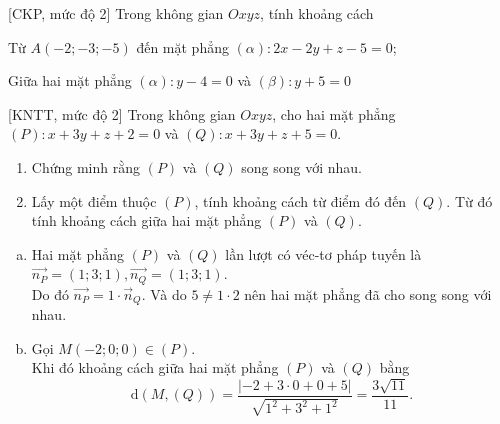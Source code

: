 \begin{bt}%
[CKP, mức độ 2]%
	Trong không gian $Oxyz$, tính khoảng cách
	\begin{listEX}
		\item Từ $ A(-2;-3;-5) $ đến mặt phẳng $ (\alpha) \colon 2x-2y+z-5=0 $;
		\item Giữa hai mặt phẳng $ (\alpha)\colon y-4=0 $ và $ (\beta)\colon y+5=0 $
	\end{listEX}
\end{bt}

\begin{bt}%
[KNTT, mức độ 2]%
	Trong không gian $Oxyz$, cho hai mặt phẳng $(P)\colon x+3y+z+2=0$ và $ (Q)\colon x+3y+z+5=0$.
	\begin{enumerate}
		\item Chứng minh rằng $(P)$ và $(Q)$ song song với nhau.
		\item  Lấy một điểm thuộc $(P)$, tính khoảng cách từ điểm đó đến $(Q)$. Từ đó tính khoảng cách giữa hai mặt phẳng $(P)$ và $(Q)$.
	\end{enumerate}
	\loigiai
	{
		\begin{enumerate}[a)]
			\item Hai mặt phẳng $(P)$ và $(Q)$ lần lượt có véc-tơ pháp tuyến là $\vec{n_P}=(1;3;1),\vec{n_Q}=(1;3;1)$.\\
			Do đó $\vec{n_P}=1 \cdot \vec{n}_Q$. Và do $5 \ne 1 \cdot 2$ nên hai mặt phẳng đã cho song song với nhau.
			\item Gọi $M(-2;0;0) \in (P)$.\\
			Khi đó khoảng cách giữa hai mặt phẳng $(P)$ và $(Q)$ bằng
			\[ \mathrm{d}(M,(Q)) = \dfrac{|-2+3\cdot0 +0 +5|}{\sqrt{1^2+3^2+1^2}} = \dfrac{3\sqrt{11}}{11}. \]
		\end{enumerate}
	}
\end{bt}

